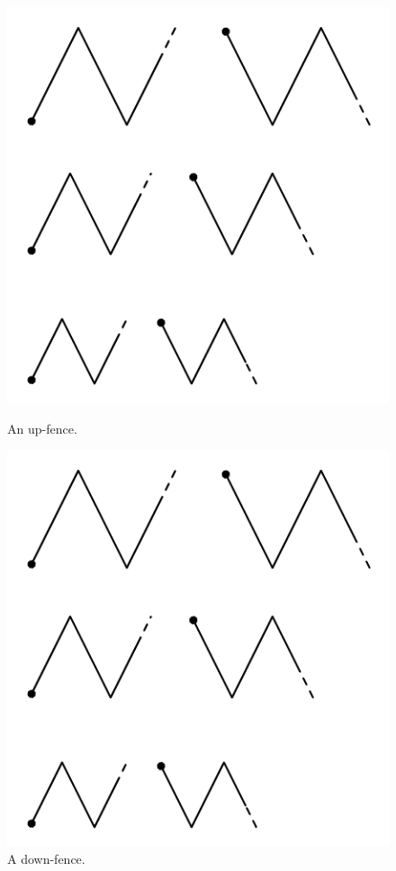 \documentclass{report}
\begin{document}
  \begin{figure}[ht]
    \begin{minipage}[b]{0.5\linewidth}
      \centering
      \includegraphics{images/up-fence_medium}
      \caption{An up-fence.}
    \end{minipage}
    \begin{minipage}[b]{0.5\linewidth}
      \centering
      \includegraphics{images/down-fence_medium}
      \caption{A down-fence.}
    \end{minipage}
  \end{figure}
\end{document}
